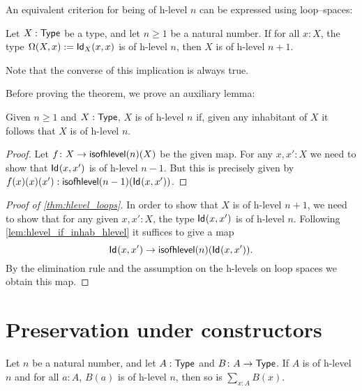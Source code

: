 An equivalent criterion for being of h-level $n$ can be expressed using loop--spaces:

\begin{thm}\label{thm:hlevel_loops}
 Let $X : \type$ be a type, and let $n\geq 1$ be a natural number.
  If for all $x : X$, the type $\Omega(X, x) := \idtype[X]{x}{x}$ is of h-level $n$,
       then $X$ is of h-level $n+1$.
\end{thm}

Note that the converse of this implication is always true.

Before proving the theorem, we prove an auxiliary lemma:

\begin{lem}\label{lem:hlevel_if_inhab_hlevel}
 Given $n \geq 1$ and $X : \type$, $X$ is of h-level $n$ if, given any inhabitant of $X$ it follows that $X$ is
   of h-level $n$.
\end{lem}

\begin{proof}
  Let $f \colon X \to \isofhlevel(n)(X)$ be the given map. For any $x, x' : X$ we need to show that
     $\idtype{x}{x'}$ is of h-level $n - 1$. But this is precisely given by
    $f(x)(x)(x') : \isofhlevel(n-1)(\idtype{x}{x'}) $.
\end{proof}


\begin{proof}[Proof of \autoref{thm:hlevel_loops}]
 In order to show that $X$ is of h-level $n+1$, we need to show that for any given $x, x' : X$,
   the type $\idtype{x}{x'}$ is of h-level $n$.
  Following \autoref{lem:hlevel_if_inhab_hlevel} it suffices to give a map
   \[ \idtype{x}{x'} \to \isofhlevel(n)(\idtype{x}{x'})  .\]
  By the elimination rule and the assumption on the h-levels on loop spaces we obtain this map.
\end{proof}

\section{Preservation under constructors}

\begin{thm}
 Let $n$ be a natural number, and let $A : \type$ and $B \colon A \to \type$.
 If $A$ is of h-level $n$ and for all $a : A$, $B(a)$ is of h-level $n$, then so is $\sum\limits_{x : A} B(x)$.
\end{thm}


